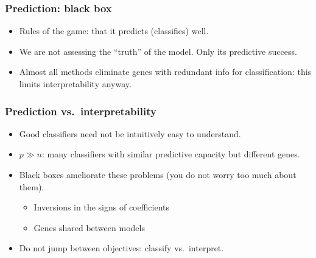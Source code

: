 \begin{frame}
\frametitle{Prediction: black box}
\begin{itemize}
\item Rules of the game: that it predicts (classifies) well.
\vspace*{20pt}
\item We are not assessing the ``truth'' of the model. Only its predictive
  success.


\vspace*{20pt}
\item Almost all methods eliminate genes with redundant info for
  classification: this limits interpretability anyway.



\end{itemize}
\end{frame}





\begin{frame}
\frametitle{Prediction vs.\ interpretability}
\begin{itemize}
\item Good classifiers need not be intuitively easy to understand.
\item $p \gg n$: many classifiers with similar predictive capacity but
  different genes.
  
\item Black boxes ameliorate these problems (you do not worry too much
  about them).
\begin{itemize}
\item Inversions in the signs of coefficients
\item Genes shared between models
\end{itemize}
\vspace*{20pt}
\item Do not jump between objectives: classify vs.\ interpret.
\end{itemize}

\end{frame}










